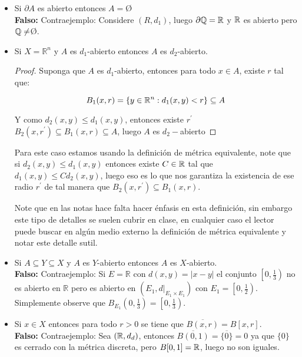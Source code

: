 \begin{itemize}[label={☠},leftmargin=*]
\item Si $\partial A$ es abierto entonces $A=$\O\\

\textbf{Falso:} Contraejemplo: Considere $(R,d_1)$, luego $\partial \mathbb{Q}=\mathbb{R}$ y $\mathbb{R}$ es abierto pero $\mathbb{Q}\neq$\O.



\item Si $X=\mathbb{R}^n$ y $A$ es $d_1$-abierto entonces $A$ es $d_2$-abierto.\\

\begin{proof}
Suponga que $A$ es $d_1$-abierto, entonces para todo $x\in A$, existe $r$ tal que:
 
$$B_1(x,r)=\{y\in \mathbb{R}^{n} : d_1(x,y)<r\}\subseteq A$$

Y como $d_2(x,y)\leq d_1(x,y)$, entonces existe $r^{\prime}$ $B_2(x,r^{\prime})\subseteq B_1(x,r)\subseteq A$, luego $A$ es $d_2-$abierto

\end{proof}

\begin{note}
Para este caso estamos usando la definición de métrica equivalente, note que si $d_2(x,y)\leq d_1(x,y)$ entonces existe $C\in \mathbb{R}$ tal que $d_1(x,y)\leq C d_2(x,y)$, luego eso es lo que nos garantiza la existencia de ese radio $r^{\prime}$ de tal manera que $B_2(x,r^{\prime})\subseteq B_1(x,r)$. 
\end{note}

\begin{note}
Note que en las notas hace falta hacer énfasis en esta definición, sin embargo este tipo de detalles se suelen cubrir en clase, en cualquier caso el lector puede buscar en algún medio externo la definición de métrica equivalente y notar este detalle sutil.
\end{note}



\item Si $A \subseteq Y \subseteq X$ y $A$ es $Y$-abierto entonces $A$ es $X$-abierto.\\

\textbf{Falso: } Contraejemplo: Si $E=\mathbb{R}$ con $d(x, y)=|x-y|$ el conjunto $\left[0, \frac{1}{3}\right)$ no es abierto en $\mathbb{R}$ pero es abierto en $\left(E_1,\left.d\right|_{E_1 \times E_1}\right)$ con $E_1=\left[0, \frac{1}{2}\right)$. Simplemente observe que $B_{E_1}\left(0, \frac{1}{3}\right)=\left[0, \frac{1}{3}\right)$.

\item Si $x \in X$ entonces para todo $r>0$ se tiene que $\overline{B(x, r)}=B[x, r]$.\\

\textbf{Falso:} Contraejemplo: Sea $(\mathbb{R},d_d)$, entonces $\overline{B(0,1)}=\overline{\{0\}}=0$ ya que $\{0\}$ es cerrado con la métrica discreta, pero $B[0,1]=\mathbb{R}$, luego no son iguales.

\end{itemize}

